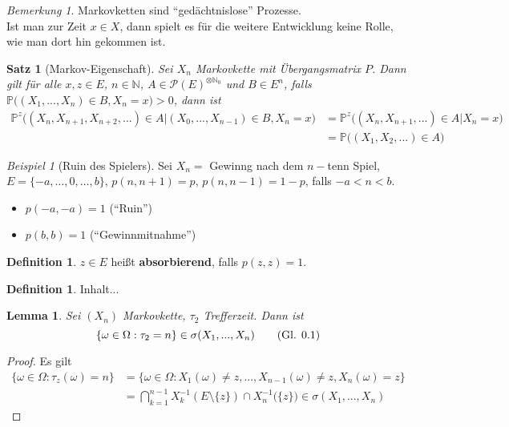 \documentclass[10pt,a4paper]{article}
\newcommand{\N}{\ensuremath{\mathbb{N}}}
\newcommand{\potset}{\mathscr P}
\newcommand{\Prb}{\mathbb P}
\theoremstyle{plain}
\newtheorem{lem}[theorem]{Lemma}
\newtheorem{satz}[theorem]{Satz}
\theoremstyle{definition}
\newtheorem{definition}[theorem]{Definition}
\theoremstyle{remark}
\newtheorem*{bem*}{Bemerkung}
\newtheorem{exm}[theorem]{Beispiel}
\newcommand{\autotag}{\stepcounter{equation}\tag{Gl. \arabic{section}.\arabic{equation}}}
\begin{document}
	\begin{bem*}
		Markovketten sind \enquote{gedächtnislose} Prozesse.\\
		Ist man zur Zeit $x\in X$, dann spielt es für die weitere Entwicklung keine Rolle, wie man dort hin gekommen ist.
	\end{bem*}

	\begin{satz}[Markov-Eigenschaft]\label{0708satzMarkov}
		Sei $X_n$ Markovkette mit Übergangsmatrix $P$. Dann gilt für alle $x,z\in E$, $n\in\N$, $A\in\potset(E)^{\otimes\N_0}$ und $B\in E^n$, falls $\Prb\big((X_1,...,X_n)\in B,X_n=x\big)>0$, dann ist
		\begin{align*}
		\Prb^z\big((X_n,X_{n+1},X_{n+2},...)\in A\vert (X_0,...,X_{n-1})\in B,X_n=x\big)&=\Prb^z\big((X_n,X_{n+1},...)\in A\vert X_n=x\big)\\
		&=\Prb\big((X_1,X_2,...)\in A\big)
		\end{align*}
	\end{satz}

	\begin{exm}[Ruin des Spielers]
		Sei $X_n=$ Gewinng nach dem $n-$tenn Spiel, $E=\{-a,...,0,...,b\}$, $p(n,n+1)=p$, $p(n,n-1)=1-p$, falls $-a<n<b$.
		\begin{itemize}
		\item $p(-a,-a)=1$ (\enquote{Ruin})
		\item $p(b,b)=1$ (\enquote{Gewinnmitnahme})
		\end{itemize}
	\end{exm}

	\begin{definition}\label{0710def}
		$z\in E$ heißt \textbf{absorbierend}, falls $p(z,z)=1$.
		\[\]
	\end{definition}
	
	\begin{definition}\label{0711def}
		Inhalt...
	\end{definition}
	
	\begin{lem}\label{0712lem}
		Sei $(X_n)$ Markovkette, $\tau_2$ Trefferzeit. Dann ist
		\[\{\omega\in\Omega:\tau_2=n\}\in\sigma(X_1,...,X_n)\autotag\label{eq:0702}\]
	\end{lem}
	\begin{proof}
		Es gilt\begin{align*}
		\{\omega\in\Omega:\tau_z(\omega)=n\}&=\{\omega\in\Omega:X_1(\omega)\neq z,...,X_{n-1}(\omega)\neq z,X_n(\omega)=z\}\\
		&=\bigcap_{k=1}^{n-1}X_k^{-1}\left(E\setminus\{z\}\right)\cap X_n^{-1}\big(\{z\}\big)\in\sigma(X_1,...,X_n)
		\end{align*}
	\end{proof}
\end{document}
